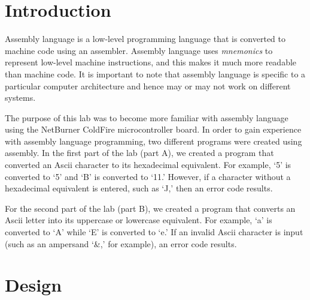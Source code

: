 \documentclass[10pt, letterpaper, titlepage]{article} %
\title{\textbf{\Huge{
\begin{center}
Introduction to\\ Assembly Language\\
\end{center}
}}}
\author{Benjamin Kong | 1573684\\Lora Ma |||| 1570935\\ \\ECE 212 Lab Section H11}
\begin{document}
 
\maketitle 
\thispagestyle{empty}
\tableofcontents 
\newpage
{}

\begin{multicols*}{2}

\section{Introduction}
Assembly language is a low-level programming language that is converted to machine code using an assembler. 
Assembly language uses \textit{mnemonics} to represent low-level machine instructions, and this makes it much more readable than machine code.
It is important to note that assembly language is specific to a particular computer architecture and hence may or may not work on different systems.

The purpose of this lab was to become more familiar with assembly language using the NetBurner ColdFire microcontroller board. 
In order to gain experience with assembly language programming, two different programs were created using assembly. 
In the first part of the lab (part A), we created a program that converted an Ascii character to its hexadecimal equivalent. 
For example, `5' is converted to `5' and `B' is converted to `11.'
However, if a character without a hexadecimal equivalent is entered, such as `J,' then an error code results.

For the second part of the lab (part B), we created a program that converts an Ascii letter into its uppercase or lowercase equivalent.
For example, `a' is converted to `A' while `E' is converted to `e.'
If an invalid Ascii character is input (such as an ampersand `\&,' for example), an error code results.


\section{Design}

\end{multicols*}
\end{document}
